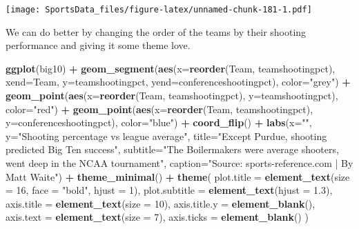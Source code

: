 \documentclass[
]{book}
\newenvironment{Shaded}{\begin{snugshade}}{\end{snugshade}}
\newcommand{\DataTypeTok}[1]{\textcolor[rgb]{0.13,0.29,0.53}{#1}}
\newcommand{\DecValTok}[1]{\textcolor[rgb]{0.00,0.00,0.81}{#1}}
\newcommand{\FloatTok}[1]{\textcolor[rgb]{0.00,0.00,0.81}{#1}}
\newcommand{\KeywordTok}[1]{\textcolor[rgb]{0.13,0.29,0.53}{\textbf{#1}}}
\newcommand{\NormalTok}[1]{#1}
\newcommand{\OperatorTok}[1]{\textcolor[rgb]{0.81,0.36,0.00}{\textbf{#1}}}
\newcommand{\StringTok}[1]{\textcolor[rgb]{0.31,0.60,0.02}{#1}}
\begin{document}
\texttt{[image: SportsData\_files/figure-latex/unnamed-chunk-181-1.pdf]}

We can do better by changing the order of the teams by their shooting performance and giving it some theme love.

\begin{Shaded}
\begin{Highlighting}[]
\KeywordTok{ggplot}\NormalTok{(big10) }\OperatorTok{+}
\StringTok{  }\KeywordTok{geom_segment}\NormalTok{(}\KeywordTok{aes}\NormalTok{(}\DataTypeTok{x=}\KeywordTok{reorder}\NormalTok{(Team, teamshootingpct), }\DataTypeTok{xend=}\NormalTok{Team, }\DataTypeTok{y=}\NormalTok{teamshootingpct, }\DataTypeTok{yend=}\NormalTok{conferenceshootingpct), }\DataTypeTok{color=}\StringTok{"grey"}\NormalTok{) }\OperatorTok{+}\StringTok{ }
\StringTok{  }\KeywordTok{geom_point}\NormalTok{(}\KeywordTok{aes}\NormalTok{(}\DataTypeTok{x=}\KeywordTok{reorder}\NormalTok{(Team, teamshootingpct), }\DataTypeTok{y=}\NormalTok{teamshootingpct), }\DataTypeTok{color=}\StringTok{"red"}\NormalTok{) }\OperatorTok{+}\StringTok{ }
\StringTok{  }\KeywordTok{geom_point}\NormalTok{(}\KeywordTok{aes}\NormalTok{(}\DataTypeTok{x=}\KeywordTok{reorder}\NormalTok{(Team, teamshootingpct), }\DataTypeTok{y=}\NormalTok{conferenceshootingpct), }\DataTypeTok{color=}\StringTok{"blue"}\NormalTok{) }\OperatorTok{+}
\StringTok{  }\KeywordTok{coord_flip}\NormalTok{() }\OperatorTok{+}
\StringTok{   }\KeywordTok{labs}\NormalTok{(}\DataTypeTok{x=}\StringTok{""}\NormalTok{, }\DataTypeTok{y=}\StringTok{"Shooting percentage vs league average"}\NormalTok{, }\DataTypeTok{title=}\StringTok{"Except Purdue, shooting predicted Big Ten success"}\NormalTok{, }\DataTypeTok{subtitle=}\StringTok{"The Boilermakers were average shooters, went deep in the NCAA tournament"}\NormalTok{, }\DataTypeTok{caption=}\StringTok{"Source: sports-reference.com | By Matt Waite"}\NormalTok{) }\OperatorTok{+}
\StringTok{  }\KeywordTok{theme_minimal}\NormalTok{() }\OperatorTok{+}\StringTok{ }
\StringTok{  }\KeywordTok{theme}\NormalTok{(}
    \DataTypeTok{plot.title =} \KeywordTok{element_text}\NormalTok{(}\DataTypeTok{size =} \DecValTok{16}\NormalTok{, }\DataTypeTok{face =} \StringTok{"bold"}\NormalTok{, }\DataTypeTok{hjust =} \DecValTok{1}\NormalTok{),}
    \DataTypeTok{plot.subtitle =} \KeywordTok{element_text}\NormalTok{(}\DataTypeTok{hjust =} \FloatTok{1.3}\NormalTok{),}
    \DataTypeTok{axis.title =} \KeywordTok{element_text}\NormalTok{(}\DataTypeTok{size =} \DecValTok{10}\NormalTok{),}
    \DataTypeTok{axis.title.y =} \KeywordTok{element_blank}\NormalTok{(),}
    \DataTypeTok{axis.text =} \KeywordTok{element_text}\NormalTok{(}\DataTypeTok{size =} \DecValTok{7}\NormalTok{),}
    \DataTypeTok{axis.ticks =} \KeywordTok{element_blank}\NormalTok{()}
\NormalTok{  )}
\end{Highlighting}
\end{Shaded}
\end{document}
